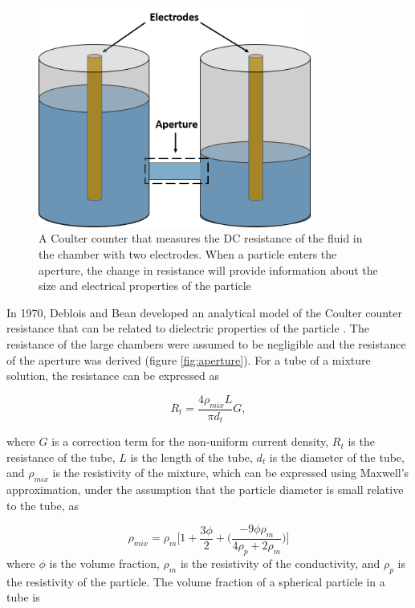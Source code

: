\begin{figure}[ht]
    \centering
    \includegraphics[width=0.8\textwidth]{images/coultierCounter.png}
    \caption[Illustration of Coulter counter principles]{A Coulter counter that measures the DC resistance of the fluid in the chamber with two electrodes. When a particle enters the aperture, the change in resistance will provide information about the size and electrical properties of the particle}
    \label{fig:coulter_counter}
\end{figure}


In 1970, Deblois and Bean developed an analytical model of the Coulter counter resistance that can be related to dielectric properties of the particle \cite{deblois_counting_1970}. The resistance of the large chambers were assumed to be negligible and the resistance of the aperture was derived (figure \ref{fig:aperture}). For a tube of a mixture solution, the resistance can be expressed as

\begin{equation}
    R_t = \frac{4\rho_{mix}L}{\pi d_{t}} G,
    \label{eqn:tube_resistance}
\end{equation}

\noindent where $G$ is a correction term for the non-uniform current density, $R_t$ is the resistance of the tube, $L$ is the length of the tube, $d_{t}$ is the diameter of the tube, and $\rho_{mix}$ is the resistivity of the mixture, which can be expressed using Maxwell's approximation, under the assumption that the particle diameter is small relative to the tube, as

\begin{equation}
    \rho_{mix} = \rho_m\bigg[ 1 + \frac{3\phi}{2} + \Big(\frac{-9\phi \rho_m}{4 \rho_p + 2 \rho_m}\Big)\bigg]
\end{equation}
\noindent where $\phi$ is the volume fraction, $\rho_m$ is the resistivity of the conductivity, and $\rho_p$ is the resistivity of the particle. The volume fraction of a spherical particle in a tube is

